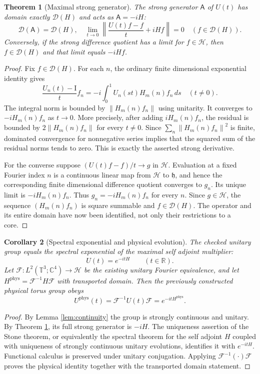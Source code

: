 \documentclass[11pt,oneside]{article}
\theoremstyle{kol}
\newtheorem{theorem}{Theorem}[section]
\newtheorem{corollary}[theorem]{Corollary}
\theoremstyle{definition}
\newcommand{\Hu}{\mathcal H}
\newcommand{\Dn}{\mathcal D}
\newcommand{\T}{\mathbb T}
\newcommand{\C}{\mathbb C}
\newcommand{\R}{\mathbb R}
\newcommand{\Id}{\mathrm I}
\newcommand{\gen}{\mathsf A}
\newcommand{\pp}[1]{\left\lVert#1\right\rVert}
\begin{document}
\begin{theorem}[Maximal strong generator]\label{thm:generator}
The strong generator $\gen$ of $U(t)$ has domain exactly $\Dn(H)$ and acts as $\gen=-iH$:
\begin{equation}\label{eq:generator}
\Dn(\gen)=\Dn(H),\quad
\lim_{t\to0}\left\lVert\frac{U(t)f-f}{t}+iHf\right\rVert=0
\quad(f\in\Dn(H)).
\end{equation}
Conversely, if the strong difference quotient has a limit for $f\in\Hu$, then $f\in\Dn(H)$ and that limit equals $-iHf$.
\end{theorem}
\begin{proof}
Fix $f\in\Dn(H)$. For each $n$, the ordinary finite dimensional exponential identity gives
\begin{equation}\label{eq:fundamental}
\frac{U_n(t)-\Id}{t}f_n=-i\int_0^1U_n(st)H_m(n)f_n\,ds
\quad(t\ne0).
\end{equation}
The integral norm is bounded by $\pp{H_m(n)f_n}$ using unitarity. It converges to $-iH_m(n)f_n$ as $t\to0$. More precisely, after adding $iH_m(n)f_n$, the residual is bounded by $2\pp{H_m(n)f_n}$ for every $t\ne0$. Since $\sum_n\pp{H_m(n)f_n}^2$ is finite, dominated convergence for nonnegative series implies that the squared sum of the residual norms tends to zero. This is exactly the asserted strong derivative.

For the converse suppose $(U(t)f-f)/t\to g$ in $\Hu$. Evaluation at a fixed Fourier index $n$ is a continuous linear map from $\Hu$ to $\mathfrak h$, and hence the corresponding finite dimensional difference quotient converges to $g_n$. Its unique limit is $-iH_m(n)f_n$. Thus $g_n=-iH_m(n)f_n$ for every $n$. Since $g\in\Hu$, the sequence $(H_m(n)f_n)$ is square summable and $f\in\Dn(H)$. The operator and its entire domain have now been identified, not only their restrictions to a core.
\end{proof}

\begin{corollary}[Spectral exponential and physical evolution]\label{cor:physical}
The checked unitary group equals the spectral exponential of the maximal self adjoint multiplier:
\[
U(t)=e^{-itH}\qquad(t\in\R).
\]
Let $\mathcal F:L^2(\T^3;\C^4)\to\Hu$ be the existing unitary Fourier equivalence, and let $H^{\mathrm{phys}}=\mathcal F^{-1}H\mathcal F$ with transported domain. Then the previously constructed physical torus group obeys
\[
U^{\mathrm{phys}}(t)=\mathcal F^{-1}U(t)\mathcal F=e^{-itH^{\mathrm{phys}}}.
\]
\end{corollary}
\begin{proof}
By Lemma \ref{lem:continuity} the group is strongly continuous and unitary. By Theorem \ref{thm:generator}, its full strong generator is $-iH$. The uniqueness assertion of the Stone theorem, or equivalently the spectral theorem for the self adjoint $H$ coupled with uniqueness of strongly continuous unitary evolutions, identifies it with $e^{-itH}$. Functional calculus is preserved under unitary conjugation. Applying $\mathcal F^{-1}(\cdot)\mathcal F$ proves the physical identity together with the transported domain statement.
\end{proof}
\end{document}
